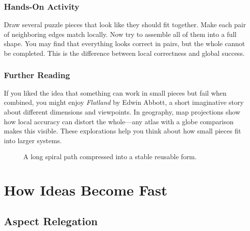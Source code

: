 \documentclass[11pt]{book}
\theoremstyle{definition}
\theoremstyle{remark}
\begin{document}
\section*{Hands-On Activity}

Draw several puzzle pieces that look like they should fit together. Make
each pair of neighboring edges match locally. Now try to assemble all
of them into a full shape. You may find that everything looks correct
in pairs, but the whole cannot be completed. This is the difference
between local correctness and global success.

\section*{Further Reading}

If you liked the idea that something can work in small pieces but fail
when combined, you might enjoy \textit{Flatland} by Edwin Abbott, a
short imaginative story about different dimensions and viewpoints.
In geography, map projections show how local accuracy can distort the
whole---any atlas with a globe comparison makes this visible. These
explorations help you think about how small pieces fit into larger
systems.

\begin{figure}[h]
\centering
{}
\caption{A long spiral path compressed into a stable reusable form.}
\end{figure}

\part{How Ideas Become Fast}

\chapter{Aspect Relegation}
\end{document}
